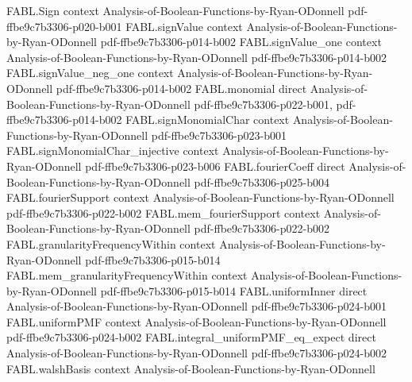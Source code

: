\begin{theorem}
\label{FABL.biasedSiteFourierFunction_orthonormal}
\leanok
{}
\proofstep
  {FABL.Sign}
  {context}
  {Analysis-of-Boolean-Functions-by-Ryan-ODonnell}
  {pdf-ffbe9c7b3306-p020-b001}
\proofstep
  {FABL.signValue}
  {context}
  {Analysis-of-Boolean-Functions-by-Ryan-ODonnell}
  {pdf-ffbe9c7b3306-p014-b002}
\proofstep
  {FABL.signValue_one}
  {context}
  {Analysis-of-Boolean-Functions-by-Ryan-ODonnell}
  {pdf-ffbe9c7b3306-p014-b002}
\proofstep
  {FABL.signValue_neg_one}
  {context}
  {Analysis-of-Boolean-Functions-by-Ryan-ODonnell}
  {pdf-ffbe9c7b3306-p014-b002}
\proofstep
  {FABL.monomial}
  {direct}
  {Analysis-of-Boolean-Functions-by-Ryan-ODonnell}
  {pdf-ffbe9c7b3306-p022-b001,
    pdf-ffbe9c7b3306-p014-b002}
\proofstep
  {FABL.signMonomialChar}
  {context}
  {Analysis-of-Boolean-Functions-by-Ryan-ODonnell}
  {pdf-ffbe9c7b3306-p023-b001}
\proofstep
  {FABL.signMonomialChar_injective}
  {context}
  {Analysis-of-Boolean-Functions-by-Ryan-ODonnell}
  {pdf-ffbe9c7b3306-p023-b006}
\proofstep
  {FABL.fourierCoeff}
  {direct}
  {Analysis-of-Boolean-Functions-by-Ryan-ODonnell}
  {pdf-ffbe9c7b3306-p025-b004}
\proofstep
  {FABL.fourierSupport}
  {context}
  {Analysis-of-Boolean-Functions-by-Ryan-ODonnell}
  {pdf-ffbe9c7b3306-p022-b002}
\proofstep
  {FABL.mem_fourierSupport}
  {context}
  {Analysis-of-Boolean-Functions-by-Ryan-ODonnell}
  {pdf-ffbe9c7b3306-p022-b002}
\proofstep
  {FABL.granularityFrequencyWithin}
  {context}
  {Analysis-of-Boolean-Functions-by-Ryan-ODonnell}
  {pdf-ffbe9c7b3306-p015-b014}
\proofstep
  {FABL.mem_granularityFrequencyWithin}
  {context}
  {Analysis-of-Boolean-Functions-by-Ryan-ODonnell}
  {pdf-ffbe9c7b3306-p015-b014}
\proofstep
  {FABL.uniformInner}
  {direct}
  {Analysis-of-Boolean-Functions-by-Ryan-ODonnell}
  {pdf-ffbe9c7b3306-p024-b001}
\proofstep
  {FABL.uniformPMF}
  {context}
  {Analysis-of-Boolean-Functions-by-Ryan-ODonnell}
  {pdf-ffbe9c7b3306-p024-b002}
\proofstep
  {FABL.integral_uniformPMF_eq_expect}
  {direct}
  {Analysis-of-Boolean-Functions-by-Ryan-ODonnell}
  {pdf-ffbe9c7b3306-p024-b002}
\proofstep
  {FABL.walshBasis}
  {context}
  {Analysis-of-Boolean-Functions-by-Ryan-ODonnell}

\end{theorem}
